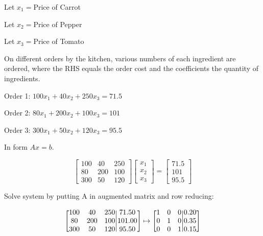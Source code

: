 \documentclass{article}
\begin{document}
Let $x_1 = $Price of Carrot

Let $x_2 = $Price of Pepper

Let $x_3 = $Price of Tomato

On different orders by the kitchen, various numbers of each ingredient are ordered, where the RHS equals the order cost and the coefficients the quantity of ingredients.

Order 1: $100x_1 + 40x_2 + 250x_3 = 71.5$

Order 2: $80x_1 + 200x_2 + 100x_3 = 101$

Order 3: $300x_1 +50x_2 + 120x_3 = 95.5$

In form $Ax=b$.

\begin{equation*}
     \begin{bmatrix}
         100 & 40 & 250 \\ 80 & 200 & 100 \\ 300 & 50 & 120
     \end{bmatrix}
     \begin{bmatrix}
         x_1 \\ x_2 \\ x_3
     \end{bmatrix}
     =
     \begin{bmatrix}
         71.5 \\ 101 \\ 95.5
     \end{bmatrix}
\end{equation*}

Solve system by putting A in augmented matrix and row reducing:

\begin{equation*}
    \Bigg[
    \begin{matrix}
         100 & 40 & 250 \\ 80 & 200 & 100 \\ 300 & 50 & 120
     \end{matrix}
     \Bigg|
     \begin{matrix}
         71.50 \\ 101.00 \\ 95.50
     \end{matrix}
     \Bigg]
     \mapsto
     \Bigg[
     \begin{matrix}
         1 &0&0\\ 0&1&0\\0&0&1
     \end{matrix}
     \Bigg{|}
     \begin{matrix}
         0.20 \\ 0.35 \\ 0.15
     \end{matrix}
     \Bigg]
\end{equation*}
\end{document}
